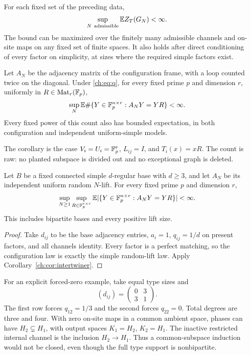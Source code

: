 \begin{theorem}\label{ch:thm:main}
For each fixed set of the preceding data,
\[
 \sup_{N\ \mathrm{admissible}}\E Z_T(G_N)<\infty.
\]
The bound can be maximized over the finitely many admissible channels and on-site maps on any fixed set of finite spaces. It also holds after direct conditioning of every factor on simplicity, at sizes where the required simple factors exist.
\end{theorem}

\begin{corollary}\label{ch:cor:intertwiner}\label{thm:frame-bounded-moment}
Let $A_N$ be the adjacency matrix of the configuration frame, with a loop counted twice on the diagonal. Under \eqref{ch:eq:q}, for every fixed prime $p$ and dimension $r$, uniformly in $R\in\operatorname{Mat}_r(\mathbb F_p)$,
\[
 \sup_N\mathbb E\#\{Y\in\mathbb F_p^{n\times r}:A_NY=YR\}<\infty.
\]
Every fixed power of this count also has bounded expectation, in both configuration and independent uniform-simple models.
\end{corollary}

The corollary is the case $V_i=U_i=\mathbb F_p^r$, $L_{ij}=I$, and $T_i(x)=xR$. The count is raw: no planted subspace is divided out and no exceptional graph is deleted.

\begin{corollary}\label{ch:cor:lift}\label{thm:lift-bounded-moment}
Let $B$ be a fixed connected simple $d$-regular base with $d\ge3$,
and let $A_N$ be its independent uniform random $N$-lift.
For every fixed prime $p$ and dimension $r$,
\[
 \sup_{N\ge1}\sup_{R\in\mathbb F_p^{r\times r}}
 \mathbb E|\{Y\in\mathbb F_p^{n\times r}:A_NY=YR\}|<\infty.
\]
This includes bipartite bases and every positive lift size.
\end{corollary}
\begin{proof}
Take $d_{ij}$ to be the base adjacency entries, $a_i=1$,
$q_{ij}=1/d$ on present factors, and all channels identity.
Every factor is a perfect matching, so the configuration law is
exactly the simple random-lift law.
Apply Corollary~\ref{ch:cor:intertwiner}.
\end{proof}

For an explicit forced-zero example, take equal type sizes and
\begin{equation}\label{ch:eq:example}
 (d_{ij})=\begin{pmatrix}0&3\\3&1\end{pmatrix}.
\end{equation}
The first row forces $q_{12}=1/3$ and the second forces $q_{22}=0$. Total degrees are three and four. With zero on-site maps in a common ambient space, phases can have $H_2\subsetneq H_1$, with output spaces $K_1=H_2$, $K_2=H_1$. The inactive restricted internal channel is the inclusion $H_2\to H_1$. Thus a common-subspace induction would not be closed, even though the full type support is nonbipartite.

